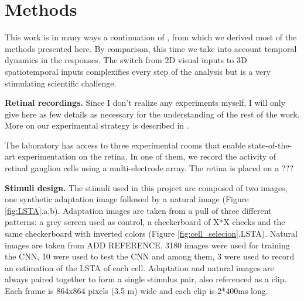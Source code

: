 \section{Methods}\label{sec:methods}

This work is in many ways a continuation of
\cite{goldin_context-dependent_2022}, from which we derived most of the methods
presented here. By comparison, this time we take into account temporal dynamics
in the responses. The switch from 2D visual inputs to 3D spatiotemporal inputs
complexifies every step of the analysis but is a very stimulating scientific
challenge.

\textbf{Retinal recordings.}
Since I don't realize any experiments myself, I will only give here as few
details as necessary for the understanding of the rest of the work. More on our
experimental strategy is described in \cite{goldin_context-dependent_2022}.

The laboratory has access to three experimental rooms that enable
state-of-the-art experimentation
on the retina.	In one of them, we record the activity of retinal ganglion
cells using a multi-electrode array. The retina is placed on a ???

\textbf{Stimuli design.}
The stimuli used in this project are composed of two images, one synthetic
adaptation image followed by a natural image (Figure \ref{fig:LSTA}.a,b).
Adaptation images are taken from
a pull of three different patterns: a grey screen used as control, a
checkerboard of X*X checks and the same checkerboard with inverted colors
(Figure \ref{fig:cell_selecion}.LSTA). Natural images are taken from ADD
REFERENCE. 3180 images were used for
training the CNN, 10 were used to test the CNN and among them, 3 were used to
record an estimation of the LSTA of each cell.
Adaptation and natural images are always paired together to form a single
stimulus pair, also referenced as a clip. Each frame is 864x864 pixels (3.5
\textmu m) wide and each clip is 2*400ms long. %

